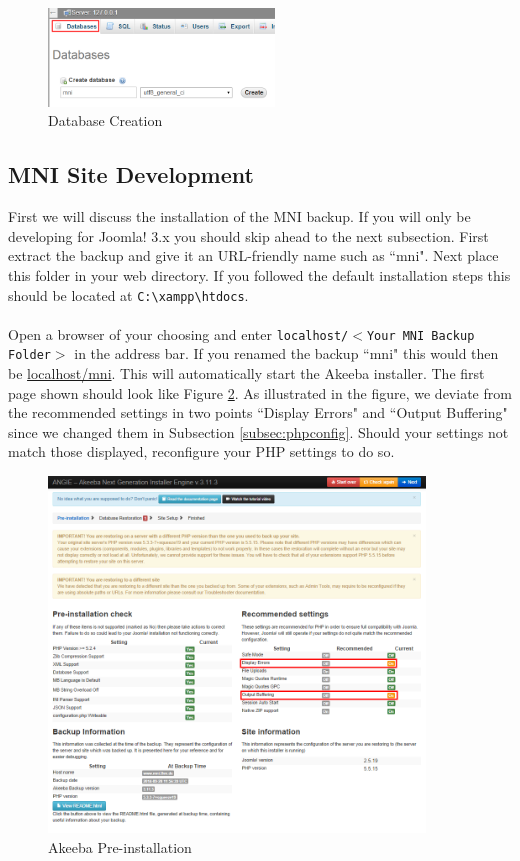 \documentclass[]{report}
\begin{document}
\begin{figure}[h] 
	\centering
	\includegraphics[width=6cm]{databasecreation.png}
	\caption{Database Creation}
	\label{fig:databasecreation}
\end{figure}

\subsection{MNI Site Development}

First we will discuss the installation of the MNI backup. If you will only be developing for Joomla! 3.x you should skip ahead to the next subsection. First extract the backup and give it an URL-friendly name such as ``mni". Next place this folder in your web directory. If you followed the default installation steps this should be located at \texttt{C:\textbackslash xampp\textbackslash htdocs}.\\
\\
Open a browser of your choosing and enter \texttt{localhost/$<$Your MNI Backup Folder$>$} in the address bar. If you renamed the backup ``mni" this would then be \url{localhost/mni}. This will automatically start the Akeeba installer. The first page shown should look like Figure \ref{fig:akeebapreinstallation}. As illustrated in the figure, we deviate from the recommended settings in two points ``Display Errors" and ``Output Buffering" since we changed them in Subsection \ref{subsec:phpconfig}. Should your settings not match those displayed, reconfigure your PHP settings to do so.\\

\begin{figure}[h] 
	\centering
	\includegraphics[width=10cm]{akeeba1.png}
	\caption{Akeeba Pre-installation}
	\label{fig:akeebapreinstallation}
\end{figure}
\end{document}
